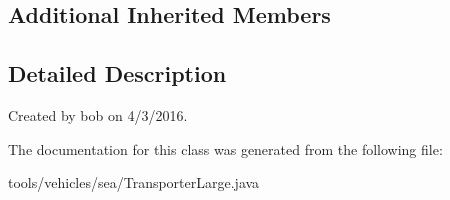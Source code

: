 \subsection*{Additional Inherited Members}


\subsection{Detailed Description}
Created by bob on 4/3/2016. 

The documentation for this class was generated from the following file\+:\begin{DoxyCompactItemize}
\item 
tools/vehicles/sea/Transporter\+Large.\+java\end{DoxyCompactItemize}
